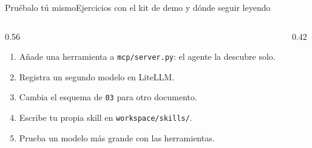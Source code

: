 \begin{frame}{Pruébalo tú mismo}{Ejercicios con el kit de demo y dónde seguir leyendo}
  \begin{columns}[T]
    \begin{column}{0.56\textwidth}
      \small
      \begin{enumerate}
        \item Añade una herramienta a \texttt{mcp/server.py}: el agente la descubre solo.
        \item Registra un segundo modelo en LiteLLM.
        \item Cambia el esquema de \texttt{03} para otro documento.
        \item Escribe tu propia skill en \texttt{workspace/skills/}.
        \item Prueba un modelo más grande con las herramientas.
      \end{enumerate}
    \end{column}
    \begin{column}{0.42\textwidth}
    \end{column}
  \end{columns}
\end{frame}
